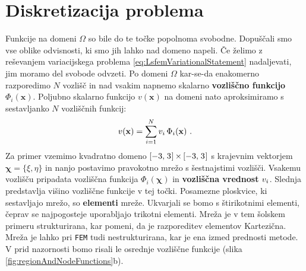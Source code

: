 \section{Diskretizacija problema}

Funkcije na domeni $\Omega$ so bile do te točke popolnoma svobodne. Dopuščali smo vse oblike odvisnosti, ki smo jih lahko nad domeno napeli. Če želimo z reševanjem variacijskega problema \eqref{eq:LsfemVariationalStatement} nadaljevati, jim moramo del svobode odvzeti. Po domeni $\Omega$ kar-se-da enakomerno razporedimo $N$ vozlišč in nad vsakim napnemo skalarno \textbf{vozliščno funkcijo} $\Phi_i(\mathbf{x})$. Poljubno skalarno funkcijo $v(\mathbf{x})$ na domeni nato aproksimiramo s sestavljanko $N$ vozliščnih funkcij:
\begin{equation}
    v(\mathbf{x}) = \sum_{i = 1}^N v_i  \mkern3mu \Phi_i(\mathbf{x}) \ .
    \label{eq:nodalSeries}
\end{equation}
Za primer vzemimo kvadratno domeno $[-3,\mkern2mu 3\mkern1mu] \mkern-1mu \times \mkern-1mu [-3,\mkern2mu 3\mkern1mu]$ s krajevnim vektorjem $\bm{\chi} = \{\xi,\eta\}$ in nanjo postavimo pravokotno mrežo s šestnajstimi vozlišči. Vsakemu vozlišču pripadata vozliščna funkcija $\Phi_i(\bm\chi)$ in \textbf{vozliščna vrednost} $v_i\mkern1mu$. Slednja predstavlja višino vozliščne funkcije v tej točki. Posamezne ploskvice, ki sestavljajo mrežo, so \textbf{elementi} mreže. Ukvarjali se bomo s štirikotnimi elementi, čeprav se najpogosteje uporabljajo trikotni elementi. Mreža je v tem šolskem primeru strukturirana, kar pomeni, da je razporeditev elementov Kartezična. Mreža je lahko pri \texttt{FEM} tudi nestrukturirana, kar je ena izmed prednosti metode. V prid nazornosti bomo risali le osrednje vozliščne funkcije (slika \ref{fig:regionAndNodeFunctions}b).

